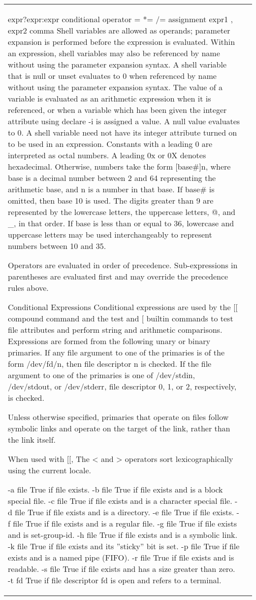 \documentclass[11pt]{article}
\begin{document}
\begin{longtable}{p{}p{}}
{{{expr?expr:expr
conditional operator
= *= /= %
assignment
expr1 , expr2
comma
Shell variables are allowed as operands; parameter expansion is performed before the expression is evaluated. Within an expression, shell variables may also be referenced by name without using the parameter expansion syntax. A shell variable that is null or unset evaluates to 0 when referenced by name without using the parameter expansion syntax. The value of a variable is evaluated as an arithmetic expression when it is referenced, or when a variable which has been given the integer attribute using declare -i is assigned a value. A null value evaluates to 0. A shell variable need not have its integer attribute turned on to be used in an expression.
Constants with a leading 0 are interpreted as octal numbers. A leading 0x or 0X denotes hexadecimal. Otherwise, numbers take the form [base#]n, where base is a decimal number between 2 and 64 representing the arithmetic base, and n is a number in that base. If base# is omitted, then base 10 is used. The digits greater than 9 are represented by the lowercase letters, the uppercase letters, @, and _, in that order. If base is less than or equal to 36, lowercase and uppercase letters may be used interchangeably to represent numbers between 10 and 35.

Operators are evaluated in order of precedence. Sub-expressions in parentheses are evaluated first and may override the precedence rules above.

Conditional Expressions
Conditional expressions are used by the [[ compound command and the test and [ builtin commands to test file attributes and perform string and arithmetic comparisons. Expressions are formed from the following unary or binary primaries. If any file argument to one of the primaries is of the form /dev/fd/n, then file descriptor n is checked. If the file argument to one of the primaries is one of /dev/stdin, /dev/stdout, or /dev/stderr, file descriptor 0, 1, or 2, respectively, is checked.

Unless otherwise specified, primaries that operate on files follow symbolic links and operate on the target of the link, rather than the link itself.

When used with [[, The < and > operators sort lexicographically using the current locale.

-a file
True if file exists.
-b file
True if file exists and is a block special file.
-c file
True if file exists and is a character special file.
-d file
True if file exists and is a directory.
-e file
True if file exists.
-f file
True if file exists and is a regular file.
-g file
True if file exists and is set-group-id.
-h file
True if file exists and is a symbolic link.
-k file
True if file exists and its ''sticky'' bit is set.
-p file
True if file exists and is a named pipe (FIFO).
-r file
True if file exists and is readable.
-s file
True if file exists and has a size greater than zero.
-t fd
True if file descriptor fd is open and refers to a terminal.

}}}
\end{longtable}
\end{document}
